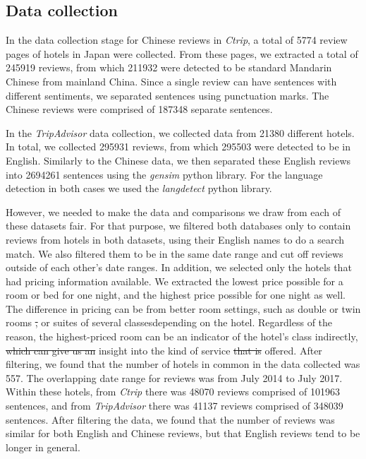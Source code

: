 \documentclass[smallextended,natbib]{svjour3}       %
\providecommand{\DIFadd}[1]{{\protect\color{blue}\uwave{#1}}} %
\providecommand{\DIFdel}[1]{{\protect\color{red}\sout{#1}}}                      %
\providecommand{\DIFaddbegin}{} %
\providecommand{\DIFaddend}{} %
\providecommand{\DIFdelbegin}{} %
\providecommand{\DIFdelend}{} %
\newcommand{\DIFscaledelfig}{0.5}
\newlength{\DIFdelgraphicswidth} %
\newlength{\DIFdelgraphicsheight} %
\newcommand{\DIFaddincludegraphics}[2][]{{\color{blue}\fbox{\DIFOincludegraphics[#1]{#2}}}} %
\newcommand{\DIFdelincludegraphics}[2][]{%
\sbox{\DIFdelgraphicsbox}{\DIFOincludegraphics[#1]{#2}}%
\settoboxwidth{\DIFdelgraphicswidth}{\DIFdelgraphicsbox} %
\settoboxtotalheight{\DIFdelgraphicsheight}{\DIFdelgraphicsbox} %
\scalebox{\DIFscaledelfig}{%
\parbox[b]{\DIFdelgraphicswidth}{\usebox{\DIFdelgraphicsbox}\\[-\baselineskip] \rule{\DIFdelgraphicswidth}{0em}}\llap{\resizebox{\DIFdelgraphicswidth}{\DIFdelgraphicsheight}{%
\setlength{\unitlength}{\DIFdelgraphicswidth}%
\begin{picture}(1,1)%
\thicklines\linethickness{2pt} %
{\color[rgb]{1,0,0}\put(0,0){\framebox(1,1){}}}%
{\color[rgb]{1,0,0}\put(0,0){\line( 1,1){1}}}%
{\color[rgb]{1,0,0}\put(0,1){\line(1,-1){1}}}%
\end{picture}%
}\hspace*{3pt}}} %
} %
\DeclareRobustCommand{\DIFaddbegin}{\DIFOaddbegin \let\includegraphics\DIFaddincludegraphics} %
\DeclareRobustCommand{\DIFaddend}{\DIFOaddend \let\includegraphics\DIFOincludegraphics} %
\DeclareRobustCommand{\DIFdelbegin}{\DIFOdelbegin \let\includegraphics\DIFdelincludegraphics} %
\DeclareRobustCommand{\DIFdelend}{\DIFOaddend \let\includegraphics\DIFOincludegraphics} %
\begin{document}
  \subsection{Data collection}\label{datacollection}

    In the data collection stage for Chinese reviews in \textit{Ctrip}, a total of \num[group-separator={,}]{5774} review pages of hotels in Japan were collected. From these pages, we extracted a total of \num[group-separator={,}]{245919} reviews, from which \num[group-separator={,}]{211932} were detected to be standard Mandarin Chinese from mainland China. Since a single review can have sentences with different sentiments, we separated sentences using punctuation marks. The Chinese reviews were comprised of \num[group-separator={,}]{187348} separate sentences. 

    In the \textit{TripAdvisor} data collection, we collected data from \num[group-separator={,}]{21380} different hotels. In total, we collected \num[group-separator={,}]{295931} reviews, from which \num[group-separator={,}]{295503} were detected to be in English. Similarly to the Chinese data, we then separated these English reviews into \num[group-separator={,}]{2694261} sentences using the \textit{gensim} python library. For the language detection in both cases we used the \textit{langdetect} python library.

    However, we needed to make the data and comparisons we draw from each of these datasets fair. For that purpose, we filtered both databases only to contain reviews from hotels in both datasets, using their English names to do a search match. We also filtered them to be in the same date range and cut off reviews outside of each other's date ranges. In addition, we selected only the hotels that had pricing information available. We extracted the lowest price possible for a room or bed for one night, and the highest price possible for one night as well. The difference in pricing can be from better room settings, such as double or twin rooms \DIFdelbegin \DIFdel{, }\DIFdelend or suites of several classes\DIFaddbegin \DIFadd{, }\DIFaddend depending on the hotel. Regardless of the reason, the highest-priced room can be an indicator of the hotel's class indirectly, \DIFdelbegin \DIFdel{which can give us an }\DIFdelend \DIFaddbegin \DIFadd{giving us }\DIFaddend insight into the kind of service \DIFdelbegin \DIFdel{that is }\DIFdelend offered. After filtering, we found that the number of hotels in common in the data collected was \num[group-separator={,}]{557}. The overlapping date range for reviews was from July 2014 to July 2017. Within these hotels, from \textit{Ctrip} there was \num[group-separator={,}]{48070} reviews comprised of \num[group-separator={,}]{101963} sentences, and from \textit{TripAdvisor} there was \num[group-separator={,}]{41137} reviews comprised of \num[group-separator={,}]{348039} sentences. After filtering the data, we found that the number of reviews was similar for both English and Chinese reviews, but that English reviews tend to be longer in general.
\end{document}
